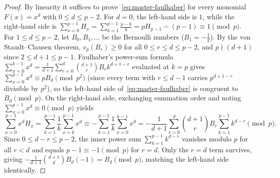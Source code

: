 \documentclass[11pt,reqno]{amsart}
\theoremstyle{definition}
\theoremstyle{remark}
\begin{document}
\begin{proof}
By linearity it suffices to prove~\eqref{eq:master-faulhaber} for every monomial $F(x) = x^d$ with $0 \le d \le p - 2$. For $d = 0$, the left-hand side is $1$, while the right-hand side is $\sum_{x=0}^{p-1} H_x = \sum_{k=1}^{p-1}\frac{p-k}{k} = p H_{p-1} - (p - 1) \equiv 1 \pmod p$. For $1 \le d \le p - 2$, let $B_0, B_1, \ldots$ be the Bernoulli numbers ($B_1 = -\frac{1}{2}$). By the von Staudt--Clausen theorem, $v_p(B_r) \ge 0$ for all $0 \le r \le d \le p - 2$, and $p \nmid (d+1)$ since $2 \le d+1 \le p-1$. Faulhaber's power-sum formula $\sum_{x=0}^{k-1} x^d = \frac{1}{d+1}\sum_{r=0}^{d}\binom{d+1}{r} B_r k^{d+1-r}$ evaluated at $k = p$ gives $\sum_{x=0}^{p-1} x^d \equiv p B_d \pmod{p^2}$ (since every term with $r \le d - 1$ carries $p^{d+1-r}$ divisible by $p^2$), so the left-hand side of~\eqref{eq:master-faulhaber} is congruent to $B_d \pmod p$. On the right-hand side, exchanging summation order and noting $\sum_{x=0}^{p-1} x^d \equiv 0 \pmod p$ yields
\[
  \sum_{x=0}^{p-1} x^d H_x
  = \sum_{k=1}^{p-1} \frac{1}{k} \sum_{x=k}^{p-1} x^d
  \equiv -\sum_{k=1}^{p-1} \frac{1}{k} \sum_{x=0}^{k-1} x^d
  = -\frac{1}{d+1} \sum_{r=0}^{d} \binom{d+1}{r} B_r \sum_{k=1}^{p-1} k^{d-r} \pmod p.
\]
Since $0 \le d - r \le p - 2$, the inner power sum $\sum_{k=1}^{p-1} k^{d-r}$ vanishes modulo $p$ for all $r < d$ and equals $p - 1 \equiv -1 \pmod p$ for $r = d$. Only the $r = d$ term survives, giving $-\frac{1}{d+1}\binom{d+1}{d} B_d (-1) = B_d \pmod p$, matching the left-hand side identically.
\end{proof}
\end{document}
